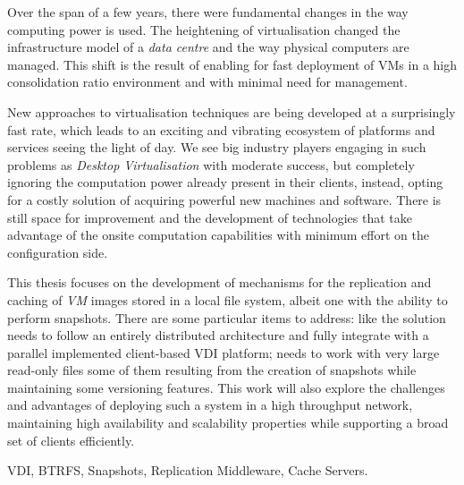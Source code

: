 
Over the span of a few years, there were fundamental changes in the way computing power is used. The heightening of virtualisation changed the infrastructure model of a \textit{data centre} and the way physical computers are managed. This shift is the result of enabling for fast deployment of \glspl{VM} in a high consolidation ratio environment and with minimal need for management.

New approaches to virtualisation techniques are being developed at a surprisingly fast rate, which leads to an exciting and vibrating ecosystem of platforms and services seeing the light of day. We see big industry players engaging in such problems as \textit{Desktop Virtualisation} with moderate success, but completely ignoring the computation power already present in their clients, instead, opting for a costly solution of acquiring powerful new machines and software. There is still space for improvement and the development of technologies that take advantage of the onsite computation capabilities with minimum effort on the configuration side.

This thesis focuses on the development of mechanisms for the replication and caching of \textit{VM} images stored in a local file system, albeit one with the ability to perform snapshots. There are some particular items to address: like the solution needs to follow an entirely distributed architecture and fully integrate with a parallel implemented client-based \gls{VDI} platform; needs to work with very large read-only files some of them resulting from the creation of snapshots while maintaining some versioning features. This work will also explore the challenges and advantages of deploying such a system in a high throughput network, maintaining high availability and scalability properties while supporting a broad set of clients efficiently. 


\begin{keywords}
	VDI, BTRFS, Snapshots, Replication Middleware, Cache Servers.
\end{keywords} 
